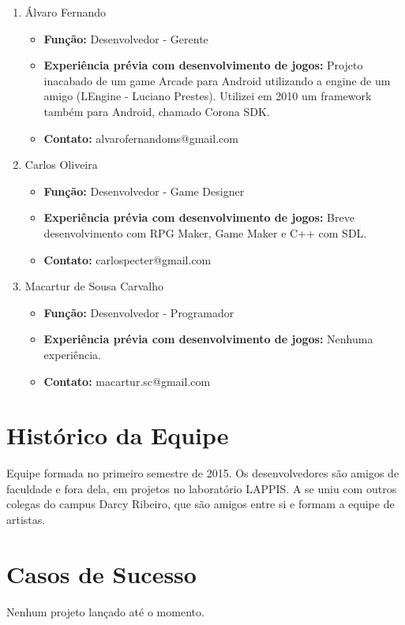 \documentclass[11pt]{article}
\begin{document}
\begin{enumerate}
\item Álvaro Fernando

\begin{itemize}
\item \textbf{Função:} Desenvolvedor - Gerente
\item \textbf{Experiência prévia com desenvolvimento de jogos:} 	
	Projeto inacabado de um game Arcade para Android utilizando a engine de
	um amigo (LEngine - Luciano Prestes). Utilizei em 2010 um framework também
	para Android, chamado Corona SDK.
\item \textbf{Contato:} alvarofernandoms@gmail.com
\end{itemize}

\item Carlos Oliveira

\begin{itemize}
\item \textbf{Função:} Desenvolvedor - Game Designer
\item \textbf{Experiência prévia com desenvolvimento de jogos:}
	Breve desenvolvimento com RPG Maker, Game Maker e C++ com SDL.
\item \textbf{Contato:} carlospecter@gmail.com
\end{itemize}

\item Macartur de Sousa Carvalho

\begin{itemize}
\item \textbf{Função:} Desenvolvedor - Programador
\item \textbf{Experiência prévia com desenvolvimento de jogos:}
	Nenhuma experiência.
\item \textbf{Contato:} macartur.sc@gmail.com
\end{itemize}

\end{enumerate}

\section{Histórico da Equipe}
 Equipe formada no primeiro semestre de 2015. Os desenvolvedores são amigos
 de faculdade e fora dela, em projetos no laboratório LAPPIS. A se uniu com
 outros colegas do campus Darcy Ribeiro, que são amigos entre si e formam a
 equipe de artistas.
 
\section{Casos de Sucesso}
 Nenhum projeto lançado até o momento.
 
\end{document}
